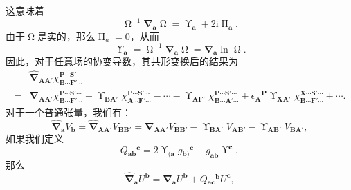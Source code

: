 这意味着
\begin{equation*}
	\upOmega^{-1}\boldsymbol{\nabla }_{\boldsymbol{a}} \upOmega=\upUpsilon _{\boldsymbol{a}} +2\mathrm{i} \upPi _{\boldsymbol{a}} .
\end{equation*}
由于$\upOmega$是实的，那么$\upPi _{a} =0$，从而
\begin{equation*}
	\upUpsilon _{\boldsymbol{a}} =\upOmega^{-1}\boldsymbol{\nabla }_{\boldsymbol{a}} \upOmega=\boldsymbol{\nabla }_{\boldsymbol{a}}\ln \upOmega.
\end{equation*}
因此，对于任意场的协变导数，其共形变换后的结果为
\begin{equation*}
	\begin{aligned}
		& \hat{\mathbf{\nabla }}_{\boldsymbol{AA} '} \chi _{\boldsymbol{B} \cdots \boldsymbol{F} '\cdots }^{\boldsymbol{P} \cdots \boldsymbol{S} '\cdots }\\
		= & \mathbf{\nabla }_{\boldsymbol{AA} '} \chi _{\boldsymbol{B} \cdots \boldsymbol{F} '\cdots }^{\boldsymbol{P} \cdots \boldsymbol{S} '\cdots } -\upUpsilon _{\boldsymbol{BA} '} \chi _{\boldsymbol{A} \cdots \boldsymbol{F} '\cdots }^{\boldsymbol{P} \cdots \boldsymbol{S} '\cdots } -\cdots -\upUpsilon _{\boldsymbol{AF} '} \chi _{\boldsymbol{B} \cdots \boldsymbol{A} '\cdots }^{\boldsymbol{P} \cdots \boldsymbol{S} '\cdots } +\epsilon {_{\boldsymbol{A}}}^{\boldsymbol{P}} \upUpsilon _{\boldsymbol{XA} '} \chi _{\boldsymbol{B} \cdots \boldsymbol{F} '\cdots }^{\boldsymbol{X} \cdots \boldsymbol{S} '\cdots } +\cdots .
	\end{aligned}
\end{equation*}
对于一个普通张量，我们有：
\begin{equation*}
	\hat{\boldsymbol{\nabla }}_{\boldsymbol{a}} V_{\boldsymbol{b}} =\hat{\boldsymbol{\nabla }}_{\boldsymbol{AA} '} V_{\boldsymbol{BB} '} =\boldsymbol{\nabla }_{\boldsymbol{AA} '} V_{\boldsymbol{BB} '} -\upUpsilon _{\boldsymbol{BA} '} V_{\boldsymbol{AB} '} -\upUpsilon _{\boldsymbol{AB} '} V_{\boldsymbol{BA} '} ,
\end{equation*}
如果我们定义
\begin{equation*}
	Q{_{\boldsymbol{ab}}}^{\boldsymbol{c}} =2\upUpsilon _{(\boldsymbol{a}} g{_{\boldsymbol{b})}}^{\boldsymbol{c}} -g_{\boldsymbol{ab}} \upUpsilon ^{\boldsymbol{c}} ,
\end{equation*}
那么
\begin{equation*}
	\hat{\boldsymbol{\nabla }}_{\boldsymbol{a}} U^{\boldsymbol{b}} =\boldsymbol{\nabla }_{\boldsymbol{a}} U^{\boldsymbol{b}} +Q{_{\boldsymbol{ac}}}^{\boldsymbol{b}} U^{\boldsymbol{c}} ,
\end{equation*}
